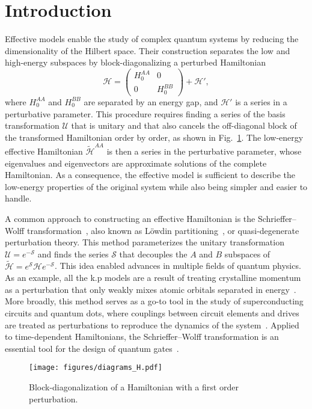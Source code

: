 \section{Introduction}

Effective models enable the study of complex quantum systems by reducing the dimensionality of the Hilbert space.
Their construction separates the low and high-energy subspaces by block-diagonalizing a perturbed Hamiltonian
%
\begin{equation}
    \mathcal{H} = \begin{pmatrix}H_0^{AA} & 0 \\ 0 & H_0^{BB}\end{pmatrix} + \mathcal{H}',
\end{equation}
%
where $H_0^{AA}$ and $H_0^{BB}$ are separated by an energy gap, and $\mathcal{H}'$ is a series in a perturbative parameter.
This procedure requires finding a series of the basis transformation $\mathcal{U}$ that is unitary and that also cancels the off-diagonal block of the transformed Hamiltonian order by order, as shown in Fig.~\ref{fig:block_diagonalization}.
The low-energy effective Hamiltonian $\tilde{\mathcal{H}}^{AA}$ is then a series in the perturbative parameter, whose eigenvalues and eigenvectors are approximate solutions of the complete Hamiltonian.
As a consequence, the effective model is sufficient to describe the low-energy properties of the original system while also being simpler and easier to handle.

A common approach to constructing an effective Hamiltonian is the Schrieffer--Wolff transformation~\cite{Schrieffer_1966,Bravyi_2011}, also known as Löwdin partitioning~\cite{Lowdin_1962}, or quasi-degenerate perturbation theory.
This method parameterizes the unitary transformation $\mathcal{U} = e^{-\mathcal{S}}$ and finds the series $\mathcal{S}$ that decouples the $A$ and $B$ subspaces of $\tilde{\mathcal{H}} = e^{\mathcal{S}}\mathcal{H}e^{-\mathcal{S}}$.
This idea enabled advances in multiple fields of quantum physics.
As an example, all the k.p models are a result of treating crystalline momentum as a perturbation that only weakly mixes atomic orbitals separated in energy~\cite{Luttinger_1955,Winkler_2003,McCann_2013,Bernevig_2021}.
More broadly, this method serves as a go-to tool in the study of superconducting circuits and quantum dots, where couplings between circuit elements and drives are treated as perturbations to reproduce the dynamics of the system~\cite{Krantz_2019,Romhanyi_2015,Venkatraman_2022}.
Applied to time-dependent Hamiltonians, the Schrieffer--Wolff transformation is an essential tool for the design of quantum gates~\cite{Petrescu_2023}.
%
\begin{figure}[h!]
    \centering
    \texttt{[image: figures/diagrams\_H.pdf]}
    \caption{
      Block-diagonalization of a Hamiltonian with a first order perturbation.
    }
    \label{fig:block_diagonalization}
\end{figure}

